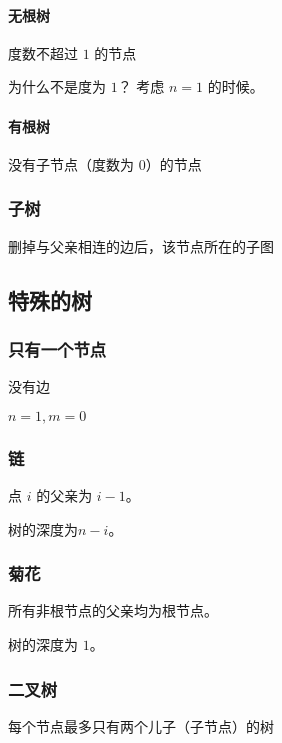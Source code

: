 \paragraph{无根树}

度数不超过 $1$ 的节点

\begin{QUESTION}{ 为什么不是度为 $1$？}{}
考虑 $n = 1$ 的时候。
\end{QUESTION}


\paragraph{有根树}

没有子节点（度数为 $0$）的节点

\subsubsection{子树}

删掉与父亲相连的边后，该节点所在的子图

\subsection{特殊的树}

\subsubsection{只有一个节点}

没有边

$n = 1, m = 0$

\subsubsection{链}

点 $i$ 的父亲为 $i - 1$。

树的深度为$n - i$。

\subsubsection{菊花}

所有非根节点的父亲均为根节点。

树的深度为 $1$。

\subsubsection{二叉树}

每个节点最多只有两个儿子（子节点）的树

